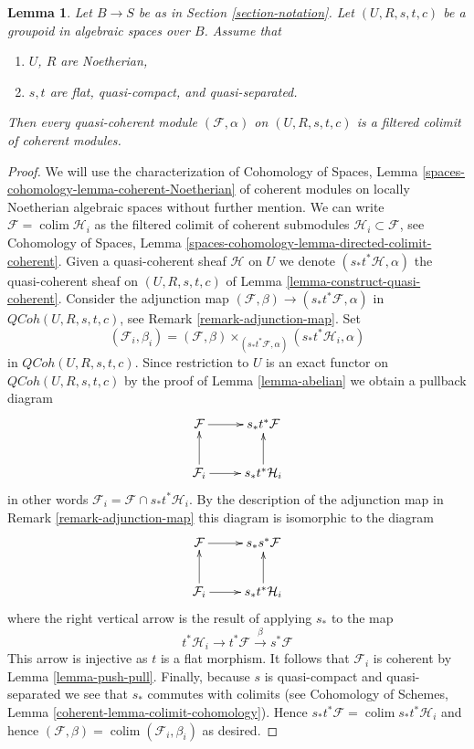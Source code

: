 \documentclass{stacks-project}
\theoremstyle{plain}
\newtheorem{lemma}[subsection]{Lemma}
\theoremstyle{definition}
\theoremstyle{remark}
\numberwithin{equation}{subsection}
\def\colim{\mathop{\mathrm{colim}}\nolimits}
\def\QCoh{\mathit{QCoh}}
\begin{document}
\begin{lemma}
\label{lemma-colimit-coherent}
Let $B \to S$ be as in Section \ref{section-notation}.
Let $(U, R, s, t, c)$ be a groupoid in algebraic spaces over $B$.
Assume that
\begin{enumerate}
\item $U$, $R$ are Noetherian,
\item $s, t$ are flat, quasi-compact, and quasi-separated.
\end{enumerate}
Then every quasi-coherent module $(\mathcal{F}, \alpha)$ on $(U, R, s, t, c)$
is a filtered colimit of coherent modules.
\end{lemma}

\begin{proof}
We will use the characterization of Cohomology of Spaces, Lemma
\ref{spaces-cohomology-lemma-coherent-Noetherian} of coherent modules
on locally Noetherian algebraic spaces without further mention. We can write
$\mathcal{F} = \colim \mathcal{H}_i$ as the filtered colimit
of coherent submodules $\mathcal{H}_i \subset \mathcal{F}$, see
Cohomology of Spaces, Lemma
\ref{spaces-cohomology-lemma-directed-colimit-coherent}.
Given a quasi-coherent sheaf $\mathcal{H}$ on $U$ we denote
$(s_*t^*\mathcal{H}, \alpha)$ the quasi-coherent sheaf on $(U, R, s, t, c)$ of
Lemma \ref{lemma-construct-quasi-coherent}. Consider the adjunction map
$(\mathcal{F}, \beta) \to (s_*t^*\mathcal{F}, \alpha)$ in
$\QCoh(U, R, s, t, c)$, see Remark \ref{remark-adjunction-map}.
Set
$$
(\mathcal{F}_i, \beta_i) =
(\mathcal{F}, \beta)
\times_{(s_*t^*\mathcal{F}, \alpha)}
(s_*t^*\mathcal{H}_i, \alpha)
$$
in $\QCoh(U, R, s, t, c)$. Since restriction to $U$ is an exact functor
on $\QCoh(U, R, s, t, c)$  by the proof of Lemma \ref{lemma-abelian}
we obtain a pullback diagram
$$
\xymatrix{
\mathcal{F} \ar[r] & s_*t^*\mathcal{F} \\
\mathcal{F}_i \ar[r] \ar[u] & s_*t^*\mathcal{H}_i \ar[u]
}
$$
in other words $\mathcal{F}_i = \mathcal{F} \cap s_*t^*\mathcal{H}_i$.
By the description of the adjunction map in Remark \ref{remark-adjunction-map}
this diagram is isomorphic to the diagram
$$
\xymatrix{
\mathcal{F} \ar[r] & s_*s^*\mathcal{F} \\
\mathcal{F}_i \ar[r] \ar[u] & s_*t^*\mathcal{H}_i \ar[u]
}
$$
where the right vertical arrow is the result of applying $s_*$ to the map
$$
t^*\mathcal{H}_i \to t^*\mathcal{F} \xrightarrow{\beta} s^*\mathcal{F}
$$
This arrow is injective as $t$ is a flat morphism. It follows that
$\mathcal{F}_i$ is coherent by Lemma \ref{lemma-push-pull}.
Finally, because $s$ is quasi-compact and quasi-separated we see that
$s_*$ commutes with colimits (see
Cohomology of Schemes, Lemma \ref{coherent-lemma-colimit-cohomology}).
Hence $s_*t^*\mathcal{F} = \colim s_*t^*\mathcal{H}_i$ and hence
$(\mathcal{F}, \beta) = \colim (\mathcal{F}_i, \beta_i)$ as desired.
\end{proof}
\end{document}
